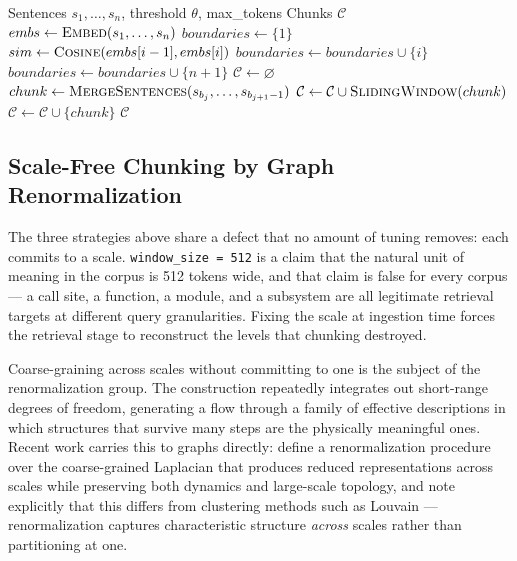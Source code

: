 \begin{algorithm}[H]
\caption{Semantic Chunking via Embedding Similarity}
\label{alg:semantic-chunk}
\begin{algorithmic}[1]
\Require Sentences $s_1, \dots, s_n$, threshold $\theta$, max\_tokens
\Ensure Chunks $\mathcal{C}$
\State $embs \gets \textsc{Embed}(s_1, \dots, s_n)$
\State $boundaries \gets \{1\}$
  \State $sim \gets \textsc{Cosine}(embs[i-1], embs[i])$
    \State $boundaries \gets boundaries \cup \{i\}$
  \EndIf
\EndFor
\State $boundaries \gets boundaries \cup \{n+1\}$
\State $\mathcal{C} \gets \varnothing$
  \State $chunk \gets \textsc{MergeSentences}(s_{b_j}, \dots, s_{b_{j+1}-1})$
    \State $\mathcal{C} \gets \mathcal{C} \cup \textsc{SlidingWindow}(chunk)$
  \Else
    \State $\mathcal{C} \gets \mathcal{C} \cup \{chunk\}$
  \EndIf
\EndFor
\State \Return $\mathcal{C}$
\end{algorithmic}
\end{algorithm}

\subsection{Scale-Free Chunking by Graph Renormalization}
\label{sec:parsing:renormalization}

The three strategies above share a defect that no amount of tuning removes: each commits to a scale. \texttt{window\_size = 512} is a claim that the natural unit of meaning in the corpus is 512 tokens wide, and that claim is false for every corpus --- a call site, a function, a module, and a subsystem are all legitimate retrieval targets at different query granularities. Fixing the scale at ingestion time forces the retrieval stage to reconstruct the levels that chunking destroyed.

Coarse-graining across scales without committing to one is the subject of the renormalization group. The construction repeatedly integrates out short-range degrees of freedom, generating a flow through a family of effective descriptions in which structures that survive many steps are the physically meaningful ones. Recent work carries this to graphs directly: \citet{spectralcoarse2025} define a renormalization procedure over the coarse-grained Laplacian that produces reduced representations across scales while preserving both dynamics and large-scale topology, and note explicitly that this differs from clustering methods such as Louvain --- renormalization captures characteristic structure \emph{across} scales rather than partitioning at one.

